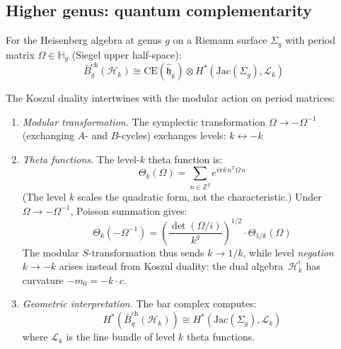 \subsection{Higher genus: quantum complementarity}

\begin{theorem}\label{thm:heisenberg-genus-g}
For the Heisenberg algebra at genus $g$ on a Riemann surface $\Sigma_g$ with period matrix $\Omega \in \mathbb{H}_g$ (Siegel upper half-space):
\[\bar{B}^{\text{ch}}_g(\mathcal{H}_k) \cong \mathrm{CE}(\hat{\mathfrak{h}}_k) \otimes H^*(\mathrm{Jac}(\Sigma_g), \mathcal{L}_k)\]

The Koszul duality intertwines with the modular action on period matrices:
\begin{enumerate}
\item \emph{Modular transformation.} The symplectic transformation $\Omega \to -\Omega^{-1}$ (exchanging $A$- and $B$-cycles) exchanges levels: $k \leftrightarrow -k$

\item \emph{Theta functions.} The level-$k$ theta function is:
\[\Theta_k(\Omega) = \sum_{n \in \mathbb{Z}^g} e^{i\pi k \, n^T \Omega \, n}\]
(The level $k$ scales the quadratic form, not the characteristic.)
Under $\Omega \to -\Omega^{-1}$, Poisson summation gives:
\[\Theta_k(-\Omega^{-1}) = \left(\frac{\det(\Omega/i)}{k^g}\right)^{1/2} \cdot \Theta_{1/k}(\Omega)\]
The modular $S$-transformation thus sends $k \to 1/k$, while level \emph{negation} $k \to -k$ arises instead from Koszul duality: the dual algebra~$\mathcal{H}_k^!$ has curvature $-m_0 = -k \cdot c$.

\item \emph{Geometric interpretation.} The bar complex computes:
\[H^*(\bar{B}_g^{\text{ch}}(\mathcal{H}_k)) \cong H^*(\text{Jac}(\Sigma_g), \mathcal{L}_k)\]
where $\mathcal{L}_k$ is the line bundle of level $k$ theta functions.
\end{enumerate}
\end{theorem}

